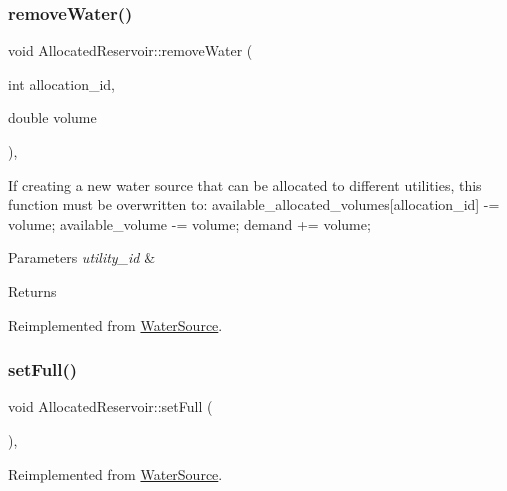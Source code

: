 \subsubsection{\texorpdfstring{remove\+Water()}{removeWater()}}
{\footnotesize\ttfamily void Allocated\+Reservoir\+::remove\+Water (\begin{DoxyParamCaption}\item[{int}]{allocation\+\_\+id,  }\item[{double}]{volume }\end{DoxyParamCaption})\hspace{0.3cm}{\ttfamily [override]}, {\ttfamily [virtual]}}

If creating a new water source that can be allocated to different utilities, this function must be overwritten to\+: available\+\_\+allocated\+\_\+volumes\mbox{[}allocation\+\_\+id\mbox{]} -\/= volume; available\+\_\+volume -\/= volume; demand += volume; 
\begin{DoxyParams}{Parameters}
{\em utility\+\_\+id} & \\
\hline
\end{DoxyParams}
\begin{DoxyReturn}{Returns}

\end{DoxyReturn}


Reimplemented from \mbox{\hyperlink{classWaterSource_ab697c3a0765d445f72533f6a5f139bd9_ab697c3a0765d445f72533f6a5f139bd9}{Water\+Source}}.

\mbox{\label{classAllocatedReservoir_aea294cbca1e1630a1307072632d14b05_aea294cbca1e1630a1307072632d14b05}} 
\subsubsection{\texorpdfstring{set\+Full()}{setFull()}}
{\footnotesize\ttfamily void Allocated\+Reservoir\+::set\+Full (\begin{DoxyParamCaption}{ }\end{DoxyParamCaption})\hspace{0.3cm}{\ttfamily [override]}, {\ttfamily [virtual]}}



Reimplemented from \mbox{\hyperlink{classWaterSource_a5f8007eb1ae604cfaa67ebb4c0c46eb1_a5f8007eb1ae604cfaa67ebb4c0c46eb1}{Water\+Source}}.

